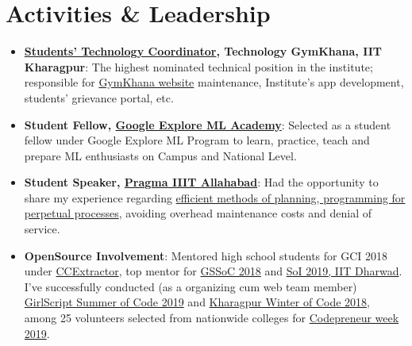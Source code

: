 \documentclass[a4paper,10pt]{extarticle} %
\begin{document}
\vspace{-0.2cm}
\section{\textcolor{primary}{Activities \& Leadership}}

\begin{itemize}[leftmargin=0.55cm, rightmargin=0.2cm, label={\Large\textbullet}]

\item \textbf{\href{https://wiki.metakgp.org/w/Constitution_of_the_Technology_Students\%27_Gymkhana#1._TECHNOLOGY_COORDINATOR:}{Students' Technology Coordinator}, Technology GymKhana, IIT Kharagpur}: The highest nominated technical position in the institute; responsible for \href{http://gymkhana.iitkgp.ac.in/index.php}{GymKhana website} maintenance, Institute's app development, students' grievance portal, etc.

\item \textbf{Student Fellow, \href{https://events.withgoogle.com/explore-ml-in/}{Google Explore ML Academy}}: Selected as a student fellow under Google Explore ML Program to learn, practice, teach and prepare ML enthusiasts on Campus and National Level.

\item \textbf{Student Speaker, \href{http://pragmaconf.tech}{Pragma IIIT Allahabad}}: Had the opportunity to share my experience regarding \href{https://prezi.com/view/tf50MBbGtm9FgPKQfieI/}{efficient methods of planning, programming for perpetual processes}, avoiding overhead maintenance costs and denial of service.

\item \textbf{OpenSource Involvement}: Mentored high school students for GCI 2018 under \href{https://codein.withgoogle.com/organizations/ccextractor-development/}{CCExtractor}, top mentor for \href{https://www.gssoc.tech/}{GSSoC 2018} and \href{https://oss2019.github.io/SoI.html}{SoI 2019, IIT Dharwad}. I've successfully conducted (as a organizing cum web team member) \href{https://gssoc.tech/}{GirlScript Summer of Code 2019} and \href{https://kwoc.kossiitkgp.org/}{Kharagpur Winter of Code 2018}, among 25 volunteers selected from nationwide colleges for \href{http://codepreneur.in}{Codepreneur week 2019}.


\end{itemize}
\end{document}
